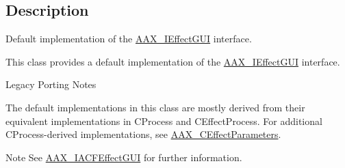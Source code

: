 \subsection{Description}
Default implementation of the \hyperlink{a00098}{A\+A\+X\+\_\+\+I\+Effect\+G\+U\+I} interface. 

This class provides a default implementation of the \hyperlink{a00098}{A\+A\+X\+\_\+\+I\+Effect\+G\+U\+I} interface.

\begin{DoxyRefDesc}{Legacy Porting Notes}
\item[\hyperlink{a00384__porting_notes000005}{Legacy Porting Notes}]The default implementations in this class are mostly derived from their equivalent implementations in C\+Process and C\+Effect\+Process. For additional C\+Process-\/derived implementations, see \hyperlink{a00018}{A\+A\+X\+\_\+\+C\+Effect\+Parameters}.\end{DoxyRefDesc}


\begin{DoxyNote}{Note}
See \hyperlink{a00060}{A\+A\+X\+\_\+\+I\+A\+C\+F\+Effect\+G\+U\+I} for further information. 
\end{DoxyNote}
